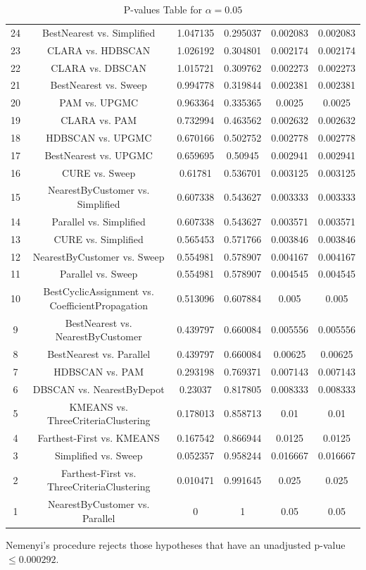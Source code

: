 \documentclass[a4paper,10pt]{article}
\begin{document}
\begin{landscape}
\begin{table}[!htp]
\begin{tabular}{cccccc}
24&BestNearest vs. Simplified&1.047135&0.295037&0.002083&0.002083\\
23&CLARA vs. HDBSCAN&1.026192&0.304801&0.002174&0.002174\\
22&CLARA vs. DBSCAN&1.015721&0.309762&0.002273&0.002273\\
21&BestNearest vs. Sweep&0.994778&0.319844&0.002381&0.002381\\
20&PAM vs. UPGMC&0.963364&0.335365&0.0025&0.0025\\
19&CLARA vs. PAM&0.732994&0.463562&0.002632&0.002632\\
18&HDBSCAN vs. UPGMC&0.670166&0.502752&0.002778&0.002778\\
17&BestNearest vs. UPGMC&0.659695&0.50945&0.002941&0.002941\\
16&CURE vs. Sweep&0.61781&0.536701&0.003125&0.003125\\
15&NearestByCustomer vs. Simplified&0.607338&0.543627&0.003333&0.003333\\
14&Parallel vs. Simplified&0.607338&0.543627&0.003571&0.003571\\
13&CURE vs. Simplified&0.565453&0.571766&0.003846&0.003846\\
12&NearestByCustomer vs. Sweep&0.554981&0.578907&0.004167&0.004167\\
11&Parallel vs. Sweep&0.554981&0.578907&0.004545&0.004545\\
10&BestCyclicAssignment vs. CoefficientPropagation&0.513096&0.607884&0.005&0.005\\
9&BestNearest vs. NearestByCustomer&0.439797&0.660084&0.005556&0.005556\\
8&BestNearest vs. Parallel&0.439797&0.660084&0.00625&0.00625\\
7&HDBSCAN vs. PAM&0.293198&0.769371&0.007143&0.007143\\
6&DBSCAN vs. NearestByDepot&0.23037&0.817805&0.008333&0.008333\\
5&KMEANS vs. ThreeCriteriaClustering&0.178013&0.858713&0.01&0.01\\
4&Farthest-First vs. KMEANS&0.167542&0.866944&0.0125&0.0125\\
3&Simplified vs. Sweep&0.052357&0.958244&0.016667&0.016667\\
2&Farthest-First vs. ThreeCriteriaClustering&0.010471&0.991645&0.025&0.025\\
1&NearestByCustomer vs. Parallel&0&1&0.05&0.05\\
\hline
\end{tabular}
\caption{P-values Table for $\alpha=0.05$}
\end{table}Nemenyi's procedure rejects those hypotheses that have an unadjusted p-value $\le0.000292$.


\end{landscape}
\end{document}
